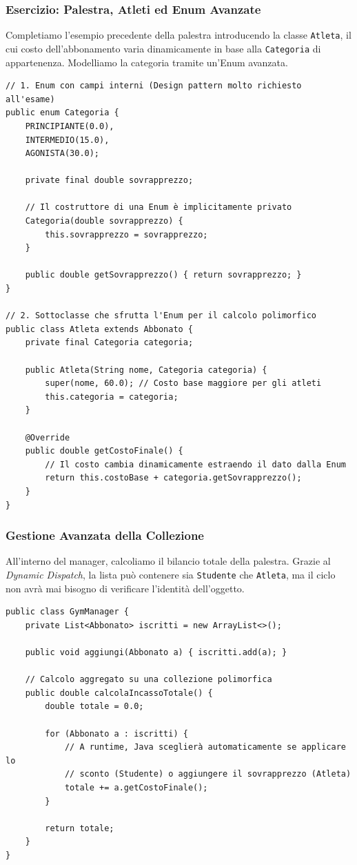 \documentclass[12pt, a4paper]{article}
\begin{document}
\newpage

\subsubsection{Esercizio: Palestra, Atleti ed Enum Avanzate}
Completiamo l'esempio precedente della palestra introducendo la classe \texttt{Atleta}, il cui costo dell'abbonamento varia dinamicamente in base alla \texttt{Categoria} di appartenenza. Modelliamo la categoria tramite un'Enum avanzata.

\begin{verbatim}
// 1. Enum con campi interni (Design pattern molto richiesto all'esame)
public enum Categoria {
    PRINCIPIANTE(0.0), 
    INTERMEDIO(15.0), 
    AGONISTA(30.0);

    private final double sovrapprezzo;

    // Il costruttore di una Enum è implicitamente privato
    Categoria(double sovrapprezzo) {
        this.sovrapprezzo = sovrapprezzo;
    }

    public double getSovrapprezzo() { return sovrapprezzo; }
}

// 2. Sottoclasse che sfrutta l'Enum per il calcolo polimorfico
public class Atleta extends Abbonato {
    private final Categoria categoria;

    public Atleta(String nome, Categoria categoria) {
        super(nome, 60.0); // Costo base maggiore per gli atleti
        this.categoria = categoria;
    }

    @Override
    public double getCostoFinale() {
        // Il costo cambia dinamicamente estraendo il dato dalla Enum
        return this.costoBase + categoria.getSovrapprezzo();
    }
}
\end{verbatim}

\newpage

\subsubsection{Gestione Avanzata della Collezione}
All'interno del manager, calcoliamo il bilancio totale della palestra. Grazie al \textit{Dynamic Dispatch}, la lista può contenere sia \texttt{Studente} che \texttt{Atleta}, ma il ciclo non avrà mai bisogno di verificare l'identità dell'oggetto.

\begin{verbatim}
public class GymManager {
    private List<Abbonato> iscritti = new ArrayList<>();

    public void aggiungi(Abbonato a) { iscritti.add(a); }

    // Calcolo aggregato su una collezione polimorfica
    public double calcolaIncassoTotale() {
        double totale = 0.0;
        
        for (Abbonato a : iscritti) {
            // A runtime, Java sceglierà automaticamente se applicare lo 
            // sconto (Studente) o aggiungere il sovrapprezzo (Atleta)
            totale += a.getCostoFinale(); 
        }
        
        return totale;
    }
}
\end{verbatim}
\end{document}
